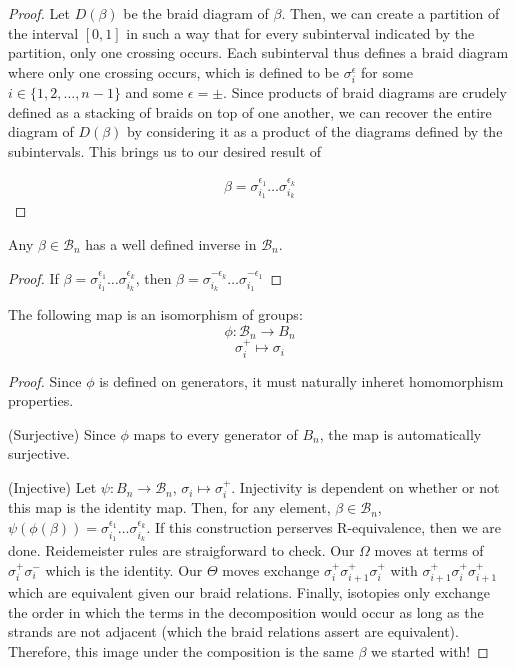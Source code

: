 \noindent \begin{proof}\cite{Kassel}  Let $D(\beta)$ be the braid diagram of $\beta$. Then, we can create a partition of the interval $[0,1]$ in such a way that for every subinterval indicated by the partition, only one crossing occurs. Each subinterval thus defines a braid diagram where only one crossing occurs, which is defined to be $\sigma_i^\epsilon$ for some $i\in\{1,2,\hdots,n-1\}$ and some $\epsilon = \pm$. Since products of braid diagrams are crudely defined as a stacking of braids on top of one another, we can recover the entire diagram of $D(\beta)$ by considering it as a product of the diagrams defined by the subintervals. This brings us to our desired result of 

\begin{equation}
\begin{aligned}
\beta = \sigma^{\epsilon_1}_{i_1}\hdots\sigma^{\epsilon_k}_{i_k}  
\end{aligned}
\end{equation}
\end{proof}

\begin{corrolary}
	Any $\beta\in\mathcal{B}_n$ has a well defined inverse in $\mathcal{B}_n$.
\end{corrolary}

\noindent\begin{proof}\cite{Kassel}  If $\beta = \sigma^{\epsilon_1}_{i_1}\hdots\sigma^{\epsilon_k}_{i_k}$, then $\beta = \sigma^{-\epsilon_k}_{i_k}\hdots\sigma^{-\epsilon_1}_{i_1}$ \end{proof} 

\begin{theorem}
	The following map is an isomorphism of groups:
$$\phi:\mathcal{B}_n\rightarrow B_n$$
$$\sigma_i^+ \mapsto \sigma_i$$
\end{theorem}

\noindent\begin{proof}\cite{Kassel}  Since $\phi$ is defined on generators, it must naturally inheret homomorphism properties. 

(Surjective) Since $\phi$ maps to every generator of $B_n$, the map is automatically surjective.

(Injective) Let $\psi:B_n\rightarrow\mathcal{B}_n$, $\sigma_i\mapsto\sigma_i^+$. Injectivity is dependent on whether or not this map is the identity map. Then, for any element, $\beta\in\mathcal{B}_n$, $\psi(\phi(\beta)) = \sigma^{\epsilon_1}_{i_1}\hdots\sigma^{\epsilon_k}_{i_k}$. If this construction perserves R-equivalence, then we are done. Reidemeister rules are straigforward to check. Our $\Omega$ moves at terms of $\sigma_i^+\sigma_i^-$ which is the identity. Our $\Theta$ moves exchange $\sigma_i^+\sigma_{i+1}^+\sigma_i^+$ with $\sigma_{i+1}^+\sigma_i^+\sigma_{i+1}^+$ which are equivalent given our braid relations. Finally, isotopies only exchange the order in which the terms in the decomposition would occur as long as the strands are not adjacent (which the braid relations assert are equivalent). Therefore, this image under the composition is the same $\beta$ we started with! \end{proof} 

